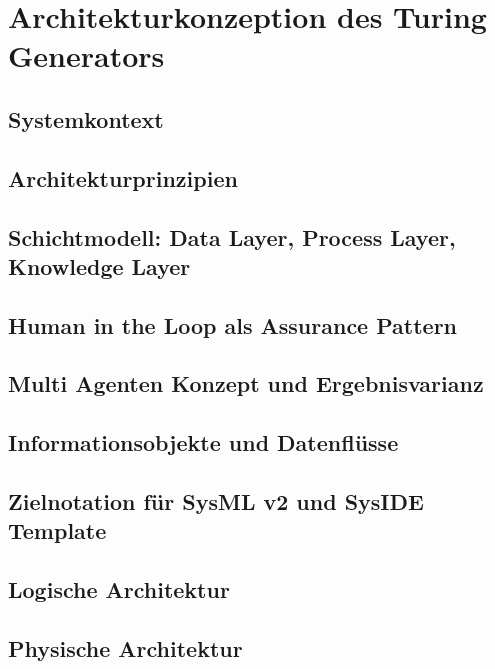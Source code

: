 \section{Architekturkonzeption des Turing Generators}
\subsection{Systemkontext}
\subsection{Architekturprinzipien}
\subsection{Schichtmodell: Data Layer, Process Layer, Knowledge Layer}
\subsection{Human in the Loop als Assurance Pattern}
\subsection{Multi Agenten Konzept und Ergebnisvarianz}
\subsection{Informationsobjekte und Datenflüsse}
\subsection{Zielnotation für SysML v2 und SysIDE Template}
\subsection{Logische Architektur}
\subsection{Physische Architektur}